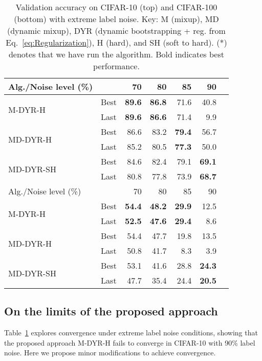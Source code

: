 \documentclass{article}
\providecommand{\tabularnewline}{\\}
\begin{document}
\begin{table}[t]
\begin{centering}
\caption{\label{tab:ExtremeNoise}Validation accuracy on CIFAR-10 (top) and CIFAR-100
(bottom) with extreme label noise. Key: M (mixup), MD (dynamic mixup),
DYR (dynamic bootstrapping + reg. from Eq.~\eqref{eq:Regularization}),
H (hard), and SH (soft to hard). ({*}) denotes that we have run the
algorithm. Bold indicates best performance.}
\vskip 0.15in 
\par\end{centering}
\begin{centering}
\begin{small}\begin{tabular}{llrrrrr}
\toprule 
Alg./Noise level (\%) &  & 70 & 80 & 85 & 90\tabularnewline
\midrule 
\multirow{2}{*}{M-DYR-H} & Best & \textbf{89.6} & \textbf{86.8} & 71.6 & 40.8\tabularnewline
 & Last & \textbf{89.6} & \textbf{86.6} & 71.4 & 9.9\tabularnewline
\midrule 
\multirow{2}{*}{MD-DYR-H} & Best & 86.6 & 83.2 & \textbf{79.4} & 56.7\tabularnewline
 & Last & 85.2 & 80.5 & \textbf{77.3} & 50.0\tabularnewline
\midrule 
\multirow{2}{*}{MD-DYR-SH} & Best & 84.6 & 82.4 & 79.1 & \textbf{69.1}\tabularnewline
 & Last & 80.8 & 77.8 & 73.9 & \textbf{68.7}\tabularnewline
\bottomrule 
\toprule 
Alg./Noise level (\%) &  & 70 & 80 & 85 & 90\tabularnewline
\midrule 
\multirow{2}{*}{M-DYR-H} & Best & \textbf{54.4} & \textbf{48.2} & \textbf{29.9} & 12.5\tabularnewline
 & Last & \textbf{52.5} & \textbf{47.6} & \textbf{29.4} & 8.6\tabularnewline
\midrule 
\multirow{2}{*}{MD-DYR-H} & Best & 54.4 & 47.7 & 19.8 & 13.5\tabularnewline
 & Last & 50.8 & 41.7 & 8.3 & 3.9\tabularnewline
\midrule 
\multirow{2}{*}{MD-DYR-SH} & Best & 53.1 & 41.6 & 28.8 & \textbf{24.3}\tabularnewline
 & Last & 47.7 & 35.4 & 24.4 & \textbf{20.5}\tabularnewline
\bottomrule 
\end{tabular}\end{small}
\par\end{centering}
\centering{}\vskip -0.1in 
\end{table}

\subsection{On the limits of the proposed approach\label{subsec:On-the-limits}}

Table~\ref{tab:ExtremeNoise} explores convergence under extreme
label noise conditions, showing that the proposed approach M-DYR-H
fails to converge in CIFAR-10 with 90\% label noise.
Here we propose minor modifications to achieve convergence.
\end{document}
